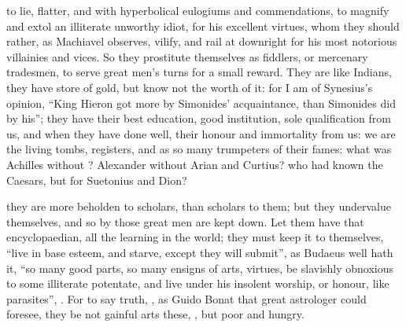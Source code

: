 to lie, flatter, and with hyperbolical eulogiums and commendations, to magnify
and extol an illiterate unworthy idiot, for his excellent virtues, whom they
should rather, as Machiavel observes, vilify, and rail at
downright for his most notorious villainies and vices. So they prostitute
themselves as fiddlers, or mercenary tradesmen, to serve great men's turns for
a small reward. They are like Indians, they have store of
gold, but know not the worth of it: for I am of Synesius's opinion,
\enquote{King Hieron got more by Simonides' acquaintance, than
Simonides did by his}; they have their best education, good institution, sole
qualification from us, and when they have done well, their honour and
immortality from us: we are the living tombs, registers, and as so many
trumpeters of their fames: what was Achilles without \Homer{}? Alexander without
Arian and Curtius? who had known the Caesars, but for Suetonius and Dion?

they are more beholden to scholars, than scholars to them; but they undervalue
themselves, and so by those great men are kept down. Let them have that
encyclopaedian, all the learning in the world; they must keep it to themselves,
\enquote{live in base esteem, and starve, except they will
submit}, as Budaeus well hath it, \enquote{so many good parts, so many ensigns of arts,
virtues, be slavishly obnoxious to some illiterate potentate, and live under
his insolent worship, or honour, like parasites}, . For to say truth, , as
Guido Bonat that great astrologer could foresee, they be not gainful arts
these, , but poor and hungry.

